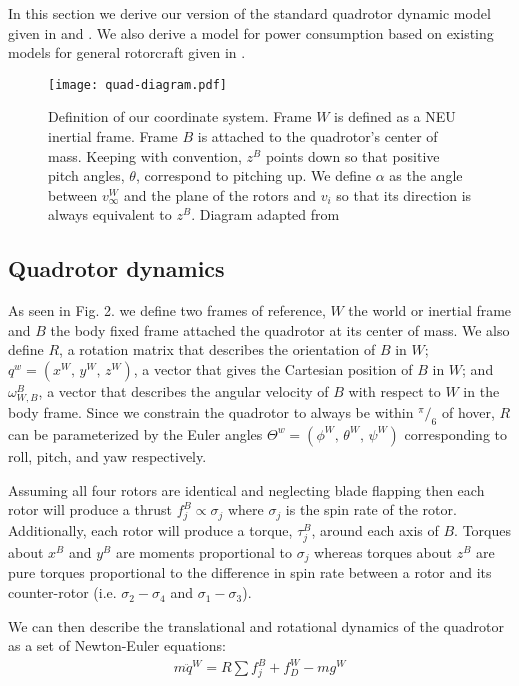 
In this section we derive our version of the standard quadrotor dynamic model given in \cite{hoffmann2004stanford} and \cite{pounds2002design}. We also derive a model for power consumption based on existing models for general rotorcraft given in \cite{leishman2006principles}.

\begin{figure}[t]
    \label{QuadDiagram}
	\centering
	\texttt{[image: quad-diagram.pdf]}
	\caption{Definition of our coordinate system. Frame $W$ is defined as a NEU inertial frame. Frame $B$ is attached to the quadrotor's center of mass. Keeping with convention, $z^B$ points down so that positive pitch angles, $\theta$, correspond to pitching up. We define $\alpha$ as the angle between $v_\infty^W$ and the plane of the rotors and $v_i$ so that its direction is always equivalent to $z^B$. Diagram adapted from \cite{tagliabue2019model}}
\end{figure}

\subsection{Quadrotor dynamics}
As seen in Fig. 2. we define two frames of reference, $W$ the world or inertial frame and $B$ the body fixed frame attached the quadrotor at its center of mass. We also define $R$, a rotation matrix that describes the orientation of $B$ in $W$; $q^{w}=\left(x^W \text{, } y^W \text{, } z^W\right)$, a vector that gives the Cartesian position of $B$ in $W$; and $\omega_{W,B}^B$, a vector that describes the angular velocity of $B$ with respect to $W$ in the body frame. Since we constrain the quadrotor to always be within $^\pi/_6$ of hover, $R$ can be parameterized by the Euler angles $\Theta^{w}=\left(\phi^W \text{, } \theta^W \text{, } \psi^W\right)$ corresponding to roll, pitch, and yaw respectively.

Assuming all four rotors are identical and neglecting blade flapping then each rotor will produce a thrust $f_j^B \propto \sigma_j$ where $\sigma_j$ is the spin rate of the rotor. Additionally, each rotor will produce a torque, $\tau_j^B$, around each axis of $B$. Torques about $x^B$ and $y^B$ are moments proportional to $\sigma_j$ whereas torques about $z^B$ are pure torques proportional to the difference in spin rate between a rotor and its counter-rotor (i.e. $\sigma_2 - \sigma_4$ and $\sigma_1 - \sigma_3$).

We can then describe the translational and rotational dynamics of the quadrotor as a set of Newton-Euler equations:
\begin{align}
    \label{NewtonEqn}
    m \ddot{q}^W=R\sum{f_j^B}+f_D^W - mg^W
\end{align}

